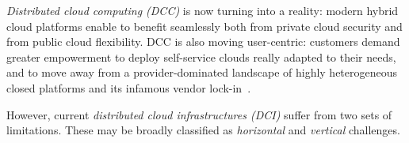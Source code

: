 \documentclass{sig-alternate}
\begin{document}
\noindent \textit{Distributed cloud computing (DCC) }is now turning into a reality: modern hybrid cloud platforms enable to benefit seamlessly both from private cloud security and from public cloud flexibility. DCC is also moving user-centric: customers demand greater empowerment to deploy self-service clouds really adapted to their needs, and to move away from a provider-dominated landscape of highly heterogeneous closed platforms and its infamous vendor lock-in~\cite{CSA:TT}. 

However, current \textit{distributed cloud infrastructures (DCI) }suffer from two sets of limitations. These may be broadly classified as \textit{horizontal} and \textit{vertical} challenges.
% 
\end{document}
